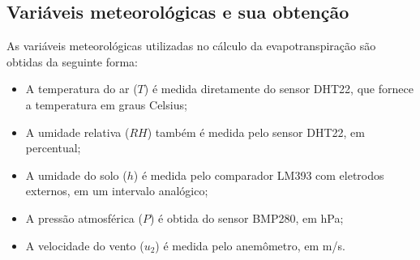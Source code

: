 \subsection{Variáveis meteorológicas e sua obtenção}

As variáveis meteorológicas utilizadas no cálculo da evapotranspiração são obtidas da seguinte forma:
\begin{itemize}
    \item A temperatura do ar (\(T\)) é medida diretamente do sensor DHT22, que fornece a temperatura em graus Celsius;
    
    \item A umidade relativa (\(RH\)) também é medida pelo sensor DHT22, em percentual;
    
    \item A umidade do solo (\(h\)) é medida pelo comparador LM393 com eletrodos externos, em um intervalo analógico;
    
    \item A pressão atmosférica (\(P\)) é obtida do sensor BMP280, em hPa;

    \item A velocidade do vento (\(u_2\)) é medida pelo anemômetro, em m/s.
\end{itemize}

